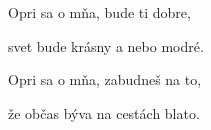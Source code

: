 \begin{song}
\bigskip


\bigskip

 Opri sa o mňa,  bude ti dobre, \par
{} svet bude krásny  a nebo modré. \par
{} Opri sa o mňa,  zabudneš na to, \par
{} že občas býva na cestách blato. \par

\end{song}

